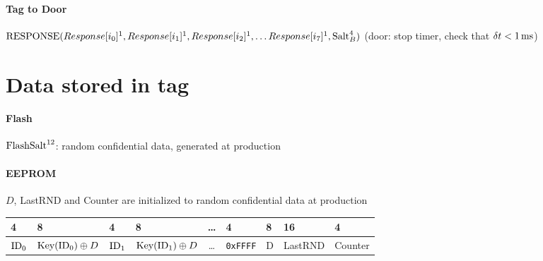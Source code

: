 \documentclass[a4paper,10pt]{scrartcl}
\begin{document}
\paragraph{Tag to Door} $\textnormal{RESPONSE}( Response[i_0]^1, Response[i_1]^1, Response[i_2]^1, \ldots Response[i_7]^1, \textnormal{Salt}_B^4 )$
(door: stop timer, check that $\delta t < 1\,\textnormal{ms}$)

\section{Data stored in tag}
\paragraph{Flash} $\textnormal{FlashSalt}^{12}$: random confidential data, generated at production
\paragraph{EEPROM} $D$, LastRND and Counter are initialized to random confidential data at production

\begin{tabular}{|*{2}{l|l||}c||l|l||l||l|}\hline
  4 & 8 & 4 & 8 & \ldots & 4 & 8 & 16 & 4 \\\hline
  $\textnormal{ID}_0$ & $\textnormal{Key}(\textnormal{ID}_0) \oplus D$ &
  $\textnormal{ID}_1$ & $\textnormal{Key}(\textnormal{ID}_1) \oplus D$ & \ldots &
  \verb|0xFFFF| & D &
  LastRND & Counter \\\hline
\end{tabular}
\end{document}
